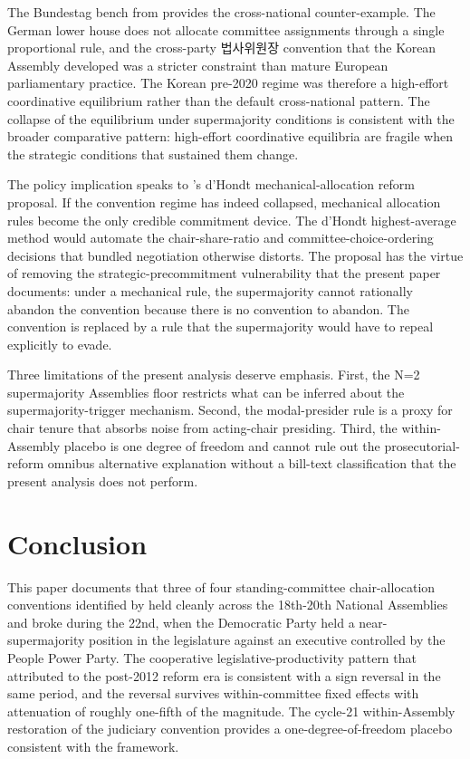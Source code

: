 \documentclass[11pt]{article}
\begin{document}
The Bundestag bench from \citet{mickler2017} provides the cross-national counter-example. The German lower house does not allocate committee assignments through a single proportional rule, and the cross-party 법사위원장 convention that the Korean Assembly developed was a stricter constraint than mature European parliamentary practice. The Korean pre-2020 regime was therefore a high-effort coordinative equilibrium rather than the default cross-national pattern. The collapse of the equilibrium under supermajority conditions is consistent with the broader comparative pattern: high-effort coordinative equilibria are fragile when the strategic conditions that sustained them change.

The policy implication speaks to \citet{leekim2022}'s d'Hondt mechanical-allocation reform proposal. If the convention regime has indeed collapsed, mechanical allocation rules become the only credible commitment device. The d'Hondt highest-average method would automate the chair-share-ratio and committee-choice-ordering decisions that bundled negotiation otherwise distorts. The proposal has the virtue of removing the strategic-precommitment vulnerability that the present paper documents: under a mechanical rule, the supermajority cannot rationally abandon the convention because there is no convention to abandon. The convention is replaced by a rule that the supermajority would have to repeal explicitly to evade.

Three limitations of the present analysis deserve emphasis. First, the N=2 supermajority Assemblies floor restricts what can be inferred about the supermajority-trigger mechanism. Second, the modal-presider rule is a proxy for chair tenure that absorbs noise from acting-chair presiding. Third, the within-Assembly placebo is one degree of freedom and cannot rule out the prosecutorial-reform omnibus alternative explanation without a bill-text classification that the present analysis does not perform.

\section{Conclusion}

This paper documents that three of four standing-committee chair-allocation conventions identified by \citet{jung2018} held cleanly across the 18th-20th National Assemblies and broke during the 22nd, when the Democratic Party held a near-supermajority position in the legislature against an executive controlled by the People Power Party. The cooperative legislative-productivity pattern that \citet{yunan2018} attributed to the post-2012 reform era is consistent with a sign reversal in the same period, and the reversal survives within-committee fixed effects with attenuation of roughly one-fifth of the magnitude. The cycle-21 within-Assembly restoration of the judiciary convention provides a one-degree-of-freedom placebo consistent with the framework.
\end{document}
